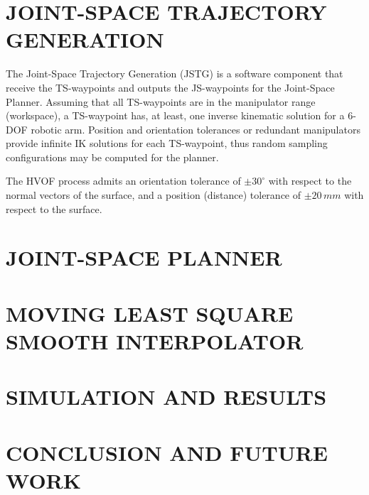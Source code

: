 \documentclass[letterpaper, 10 pt, conference]{ieeeconf}  %
\begin{document}
\section{JOINT-SPACE TRAJECTORY GENERATION}\label{sec:ikfast}
The Joint-Space Trajectory Generation (JSTG) is a software component that
receive the TS-waypoints and outputs the JS-waypoints for the Joint-Space
Planner. Assuming that all TS-waypoints are in the manipulator range
(workspace), a TS-waypoint has, at least, one inverse kinematic solution for
a 6-DOF robotic arm. Position and orientation tolerances or redundant
manipulators provide infinite IK solutions for each TS-waypoint, thus random
sampling configurations may be computed for the planner.

The HVOF process admits an orientation tolerance of $\pm 30^\circ$
with respect to the normal vectors of the surface, and a position
(distance) tolerance of $\pm 20\,mm$ with respect to the surface.

\section{JOINT-SPACE PLANNER}\label{sec:dijkstra}

\section{MOVING LEAST SQUARE SMOOTH INTERPOLATOR}\label{sec:mls}


\section{SIMULATION AND RESULTS}\label{sec:results} 

\section{CONCLUSION AND FUTURE WORK}
\end{document}
